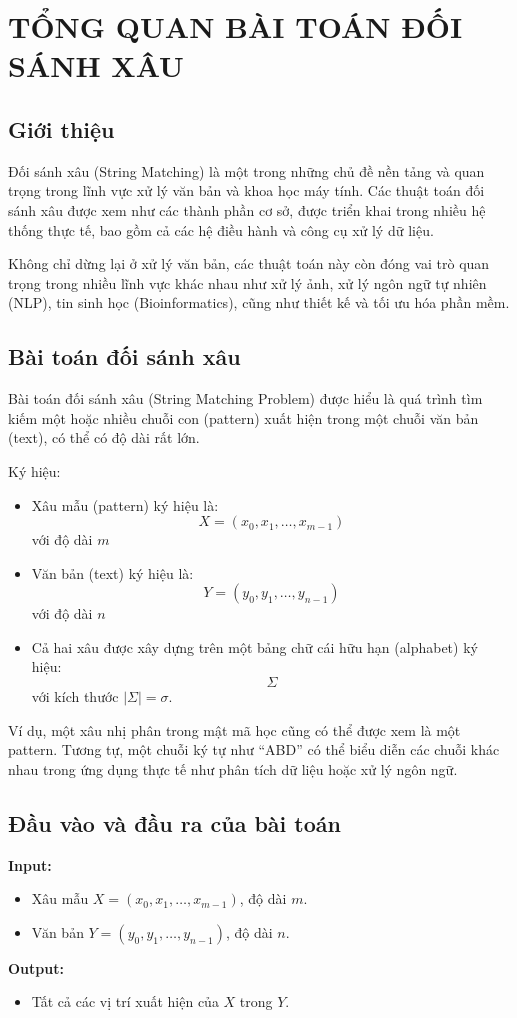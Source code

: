 \chapter{TỔNG QUAN BÀI TOÁN ĐỐI SÁNH XÂU}

\section{Giới thiệu}
Đối sánh xâu (String Matching) là một trong những chủ đề nền tảng và quan trọng trong lĩnh vực xử lý văn bản và khoa học máy tính. Các thuật toán đối sánh xâu được xem như các thành phần cơ sở, được triển khai trong nhiều hệ thống thực tế, bao gồm cả các hệ điều hành và công cụ xử lý dữ liệu.

Không chỉ dừng lại ở xử lý văn bản, các thuật toán này còn đóng vai trò quan trọng trong nhiều lĩnh vực khác nhau như xử lý ảnh, xử lý ngôn ngữ tự nhiên (NLP), tin sinh học (Bioinformatics), cũng như thiết kế và tối ưu hóa phần mềm.
\section{Bài toán đối sánh xâu}

Bài toán đối sánh xâu (String Matching Problem) được hiểu là quá trình tìm kiếm một hoặc nhiều chuỗi con (pattern) xuất hiện trong một chuỗi văn bản (text), có thể có độ dài rất lớn.

Ký hiệu:
\begin{itemize}
    \item Xâu mẫu (pattern) ký hiệu là:
    \[
    X = (x_0, x_1, \dots, x_{m-1})
    \]
    với độ dài $m$

    \item Văn bản (text) ký hiệu là:
    \[
    Y = (y_0, y_1, \dots, y_{n-1})
    \]
    với độ dài $n$

    \item Cả hai xâu được xây dựng trên một bảng chữ cái hữu hạn (alphabet) ký hiệu:
    \[
    \Sigma
    \]
    với kích thước $|\Sigma| = \sigma$.
\end{itemize}

Ví dụ, một xâu nhị phân trong mật mã học cũng có thể được xem là một pattern. Tương tự, một chuỗi ký tự như “ABD” có thể biểu diễn các chuỗi khác nhau trong ứng dụng thực tế như phân tích dữ liệu hoặc xử lý ngôn ngữ.


\section{Đầu vào và đầu ra của bài toán}

\textbf{Input:}
\begin{itemize}
    \item Xâu mẫu $X = (x_0, x_1, \dots, x_{m-1})$, độ dài $m$.
    \item Văn bản $Y = (y_0, y_1, \dots, y_{n-1})$, độ dài $n$.
\end{itemize}

\textbf{Output:}
\begin{itemize}
    \item Tất cả các vị trí xuất hiện của $X$ trong $Y$.
\end{itemize}